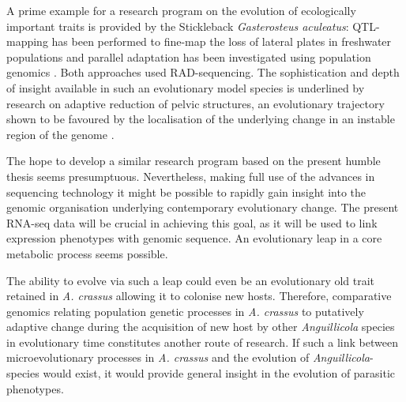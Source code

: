 \documentclass[10pt]{article}
\begin{document}
A prime example for a research program on the evolution of
ecologically important traits is provided by the Stickleback
\textit{Gasterosteus aculeatus}: QTL-mapping has been performed to
fine-map the loss of lateral plates in freshwater populations
\cite{pmid18852878} and parallel adaptation has been investigated
using population genomics \cite{pmid20195501}. Both approaches used
RAD-sequencing. The sophistication and depth of insight available in
such an evolutionary model species is underlined by research on
adaptive reduction of pelvic structures, an evolutionary trajectory
shown to be favoured by the localisation of the underlying change in
an instable region of the genome \cite{pmid20007865}.

The hope to develop a similar research program based on the present
humble thesis seems presumptuous. Nevertheless, making full use of the
advances in sequencing technology it might be possible to rapidly gain
insight into the genomic organisation underlying contemporary
evolutionary change. The present RNA-seq data will be crucial in
achieving this goal, as it will be used to link expression phenotypes
with genomic sequence. An evolutionary leap in a core metabolic
process seems possible.

The ability to evolve via such a leap could even be an evolutionary
old trait retained in \textit{A. crassus} allowing it to colonise new
hosts. Therefore, comparative genomics relating population genetic
processes in \textit{A. crassus} to putatively adaptive change during
the acquisition of new host by other \textit{Anguillicola} species in
evolutionary time constitutes another route of research. If such a
link between microevolutionary processes in \textit{A. crassus} and
the evolution of \textit{Anguillicola}-species would exist, it would
provide general insight in the evolution of parasitic phenotypes.
\end{document}

